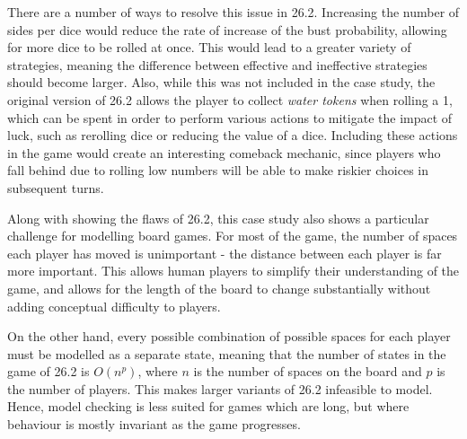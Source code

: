 There are a number of ways to resolve this issue in 26.2. Increasing the number of sides per dice would reduce the rate of increase of the bust probability, allowing for more dice to be rolled at once. This would lead to a greater variety of strategies, meaning the difference between effective and ineffective strategies should become larger. Also, while this was not included in the case study, the original version of 26.2 allows the player to collect \emph{water tokens} when rolling a 1, which can be spent in order to perform various actions to mitigate the impact of luck, such as rerolling dice or reducing the value of a dice. Including these actions in the game would create an interesting comeback mechanic, since players who fall behind due to rolling low numbers will be able to make riskier choices in subsequent turns.

Along with showing the flaws of 26.2, this case study also shows a particular challenge for modelling board games. For most of the game, the number of spaces each player has moved is unimportant - the distance between each player is far more important. This allows human players to simplify their understanding of the game, and allows for the length of the board to change substantially without adding conceptual difficulty to players.

On the other hand, every possible combination of possible spaces for each player must be modelled as a separate state, meaning that the number of states in the game of 26.2 is $O(n^p)$, where $n$ is the number of spaces on the board and $p$ is the number of players. This makes larger variants of 26.2 infeasible to model. Hence, model checking is less suited for games which are long, but where behaviour is mostly invariant as the game progresses.